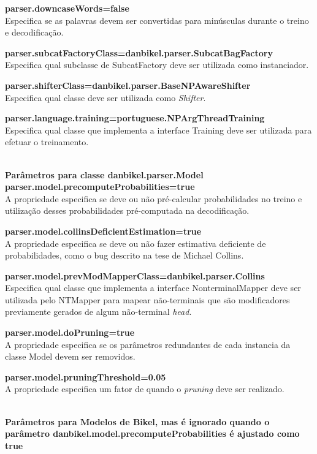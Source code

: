 \textbf{parser.downcaseWords=false}\\
Especifica se as palavras devem ser convertidas para minúsculas durante o treino e decodificação.

\textbf{parser.subcatFactoryClass=danbikel.parser.SubcatBagFactory}\\
Especifica qual subclasse de SubcatFactory deve ser utilizada como instanciador.

\textbf{parser.shifterClass=danbikel.parser.BaseNPAwareShifter}\\
Especifica qual classe deve ser utilizada como \emph{Shifter}.

\textbf{parser.language.training=portuguese.NPArgThreadTraining}\\
Especifica qual classe que implementa a interface Training deve ser utilizada para efetuar o treinamento.

\HRule \\

\textbf{Parâmetros para classe danbikel.parser.Model}\\

\textbf{parser.model.precomputeProbabilities=true}\\
A propriedade especifica se deve ou não pré-calcular probabilidades no treino e utilização desses probabilidades pré-computada na decodificação.

\textbf{parser.model.collinsDeficientEstimation=true}\\
A propriedade especifica se deve ou não fazer estimativa deficiente de probabilidades, como o bug descrito na tese de Michael Collins.

\textbf{parser.model.prevModMapperClass=danbikel.parser.Collins}\\
Especifica qual classe que implementa a interface NonterminalMapper deve ser utilizada pelo NTMapper para mapear não-terminais que são modificadores previamente gerados de algum não-terminal \emph{head}.

\textbf{parser.model.doPruning=true}\\
A propriedade especifica se os parâmetros redundantes de cada instancia da classe Model devem ser removidos.

\textbf{parser.model.pruningThreshold=0.05}\\
A propriedade especifica um fator de quando o \emph{pruning} deve ser realizado.

\HRule \\

\textbf{Parâmetros para Modelos de Bikel, mas é ignorado quando o parâmetro danbikel.model.precomputeProbabilities é ajustado como true}\\

